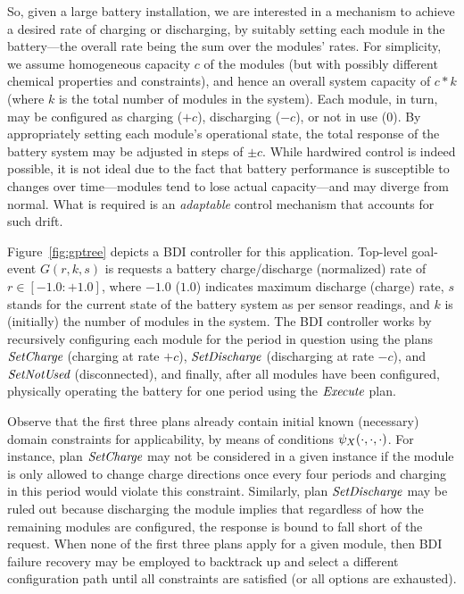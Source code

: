 So, given a large battery installation, we are interested in a mechanism to achieve a desired rate of charging or discharging, by suitably setting each module in the battery---the overall rate being the sum over the modules' rates.  
For simplicity, we assume homogeneous capacity $c$ of the modules (but with possibly different chemical properties and constraints), and hence an overall system capacity of $c*k$ (where $k$ is the total number of modules in the system). Each module, in turn, may be configured as charging ($+c$), discharging ($-c$), or not in use ($0$). By appropriately setting each module's operational state, the total response of the battery system may be adjusted in steps of $\pm c$.
While hardwired control is indeed possible, it is not ideal due to the fact that battery performance is susceptible to changes over time---modules tend to lose actual capacity---and may diverge from normal. 
What is required is an \emph{adaptable} control mechanism that accounts for such drift. 

Figure~\ref{fig:gptree} depicts a BDI controller for this application. Top-level goal-event $G(r,k,s)$ is requests a battery charge/discharge (normalized) rate of $r \in [-1.0:+1.0]$, where $-1.0$ ($1.0$) indicates maximum discharge (charge) rate, $s$ stands for the current state of the battery system as per sensor readings, and $k$ is (initially) the number of modules in the system. 
The BDI controller works by recursively configuring each module for the period in question using the plans $\operatorname{\textit{SetCharge}}$ (charging at rate $+c$), $\operatorname{\textit{SetDischarge}}$ (discharging at rate $-c$), and $\operatorname{\textit{SetNotUsed}}$ (disconnected), and finally, after all modules have been configured, physically operating the battery for one period using the $\operatorname{\textit{Execute}}$ plan. 

Observe that the first three plans already contain initial known (necessary) domain constraints for applicability, by means of conditions $\psi_X(\cdot,\cdot,\cdot)$. For instance, plan $\operatorname{\textit{SetCharge}}$ may not be considered in a given instance if the module is only allowed to change charge directions once every four periods and charging in this period would violate this constraint. 
Similarly, plan $\operatorname{\textit{SetDischarge}}$ may be ruled out because discharging the module implies that regardless of how the remaining modules are configured, the response is bound to fall short of the request.
When none of the first three plans apply for a given module, then BDI failure recovery may be employed to backtrack up and select a different configuration path until all constraints are satisfied (or all options are exhausted). 

